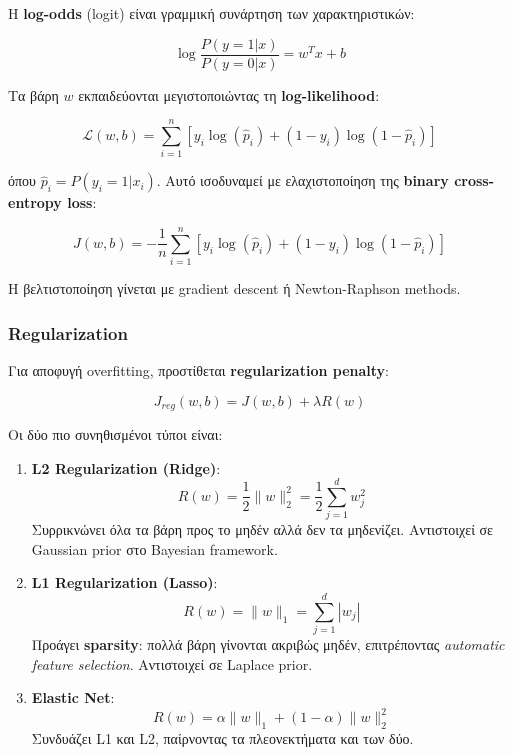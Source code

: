 \documentclass[12pt,a4paper,twoside]{book}
\begin{document}
Η \textbf{log-odds} (logit) είναι γραμμική συνάρτηση των χαρακτηριστικών:

\begin{equation}
    \log \frac{P(y=1|x)}{P(y=0|x)} = w^T x + b
\end{equation}

Τα βάρη \(w\) εκπαιδεύονται μεγιστοποιώντας τη \textbf{log-likelihood}:

\begin{equation}
    \mathcal{L}(w, b) = \sum_{i=1}^{n} \left[ y_i \log(\hat{p}_i) + (1-y_i) \log(1-\hat{p}_i) \right]
\end{equation}

όπου \(\hat{p}_i = P(y_i=1|x_i)\). Αυτό ισοδυναμεί με ελαχιστοποίηση της \textbf{binary cross-entropy loss}:

\begin{equation}
    J(w, b) = -\frac{1}{n} \sum_{i=1}^{n} \left[ y_i \log(\hat{p}_i) + (1-y_i) \log(1-\hat{p}_i) \right]
\end{equation}

Η βελτιστοποίηση γίνεται με gradient descent ή Newton-Raphson methods.

\subsubsection{Regularization}

Για αποφυγή overfitting, προστίθεται \textbf{regularization penalty}:

\begin{equation}
    J_{reg}(w, b) = J(w, b) + \lambda R(w)
\end{equation}

Οι δύο πιο συνηθισμένοι τύποι είναι:

\begin{enumerate}
    \item \textbf{L2 Regularization (Ridge)}:
          \begin{equation}
              R(w) = \frac{1}{2} \|w\|_2^2 = \frac{1}{2} \sum_{j=1}^{d} w_j^2
          \end{equation}
          Συρρικνώνει όλα τα βάρη προς το μηδέν αλλά δεν τα μηδενίζει. Αντιστοιχεί σε Gaussian prior στο Bayesian framework.

    \item \textbf{L1 Regularization (Lasso)}:
          \begin{equation}
              R(w) = \|w\|_1 = \sum_{j=1}^{d} |w_j|
          \end{equation}
          Προάγει \textbf{sparsity}: πολλά βάρη γίνονται ακριβώς μηδέν, επιτρέποντας \textit{automatic feature selection}. Αντιστοιχεί σε Laplace prior.

    \item \textbf{Elastic Net}:
          \begin{equation}
              R(w) = \alpha \|w\|_1 + (1-\alpha) \|w\|_2^2
          \end{equation}
          Συνδυάζει L1 και L2, παίρνοντας τα πλεονεκτήματα και των δύο.
\end{enumerate}
\end{document}

